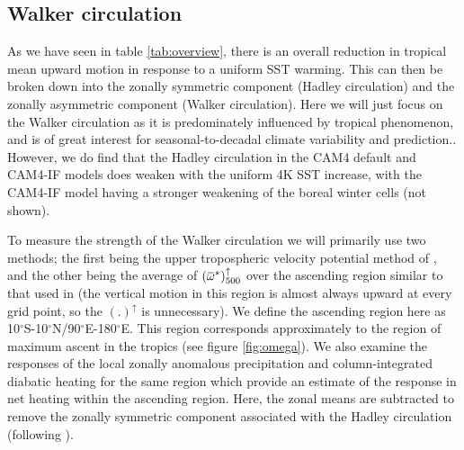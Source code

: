 \documentclass[letterpaper,12pt,titlepage,oneside,final]{book}
\newcommand{\overbar}[1]{\mkern 1.5mu\overline{\mkern-1.5mu#1\mkern-1.5mu}\mkern 1.5mu}
\begin{document}
\subsection{Walker circulation} 

As we have seen in table \ref{tab:overview}, there is an overall reduction in tropical mean upward motion in response to a uniform SST warming. This can then be broken down into the zonally symmetric component (Hadley circulation) and the zonally asymmetric component (Walker circulation). Here we will just focus on the Walker circulation as it is predominately influenced by tropical phenomenon, and is of great interest for seasonal-to-decadal climate variability and prediction.. However, we do find that the Hadley circulation in the CAM4 default and CAM4-IF models does weaken with the uniform 4K SST increase, with the CAM4-IF model having a stronger weakening of the boreal winter cells (not shown).

To measure the strength of the Walker circulation we will primarily use two methods; the first being the upper tropospheric velocity potential method of \citep{tanaka_trend_2004}, and the other being the average of $(\overbar{\omega}^{*})_{500}^{\uparrow}$ over the ascending region similar to that used in \citep{wills_local_2017} (the vertical motion in this region is almost always upward at every grid point, so the $(.)^{\uparrow}$ is unnecessary). We define the ascending region here as 10$^{\circ}$S-10$^{\circ}$N/90$^{\circ}$E-180$^{\circ}$E. This region corresponds approximately to the region of maximum ascent in the tropics (see figure \ref{fig:omega}). We also examine the responses of the local zonally anomalous precipitation and column-integrated diabatic heating for the same region which provide an estimate of the response in net heating within the ascending region. Here, the zonal means are subtracted to remove the zonally symmetric component associated with the Hadley circulation (following \cite{wills_local_2017}).
\end{document}
